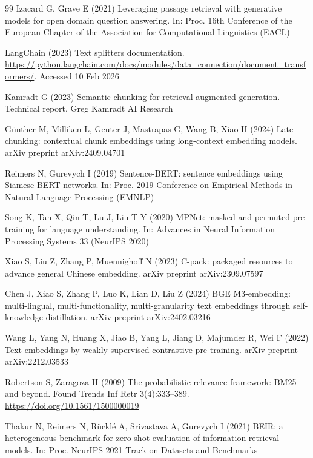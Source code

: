 \documentclass[12pt]{article}
\begin{document}
\begin{thebibliography}{99}
Izacard G, Grave E (2021) Leveraging passage retrieval with generative models for open domain question answering. In: Proc. 16th Conference of the European Chapter of the Association for Computational Linguistics (EACL)

LangChain (2023) Text splitters documentation. \url{https://python.langchain.com/docs/modules/data_connection/document_transformers/}. Accessed 10 Feb 2026

Kamradt G (2023) Semantic chunking for retrieval-augmented generation. Technical report, Greg Kamradt AI Research

G\"{u}nther M, Milliken L, Geuter J, Mastrapas G, Wang B, Xiao H (2024) Late chunking: contextual chunk embeddings using long-context embedding models. arXiv preprint arXiv:2409.04701

Reimers N, Gurevych I (2019) Sentence-BERT: sentence embeddings using Siamese BERT-networks. In: Proc. 2019 Conference on Empirical Methods in Natural Language Processing (EMNLP)

Song K, Tan X, Qin T, Lu J, Liu T-Y (2020) MPNet: masked and permuted pre-training for language understanding. In: Advances in Neural Information Processing Systems 33 (NeurIPS 2020)

Xiao S, Liu Z, Zhang P, Muennighoff N (2023) C-pack: packaged resources to advance general Chinese embedding. arXiv preprint arXiv:2309.07597

Chen J, Xiao S, Zhang P, Luo K, Lian D, Liu Z (2024) BGE M3-embedding: multi-lingual, multi-functionality, multi-granularity text embeddings through self-knowledge distillation. arXiv preprint arXiv:2402.03216

Wang L, Yang N, Huang X, Jiao B, Yang L, Jiang D, Majumder R, Wei F (2022) Text embeddings by weakly-supervised contrastive pre-training. arXiv preprint arXiv:2212.03533

Robertson S, Zaragoza H (2009) The probabilistic relevance framework: BM25 and beyond. Found Trends Inf Retr 3(4):333--389. \url{https://doi.org/10.1561/1500000019}

Thakur N, Reimers N, R\"{u}ckl\'{e} A, Srivastava A, Gurevych I (2021) BEIR: a heterogeneous benchmark for zero-shot evaluation of information retrieval models. In: Proc. NeurIPS 2021 Track on Datasets and Benchmarks


\end{thebibliography}
\end{document}
